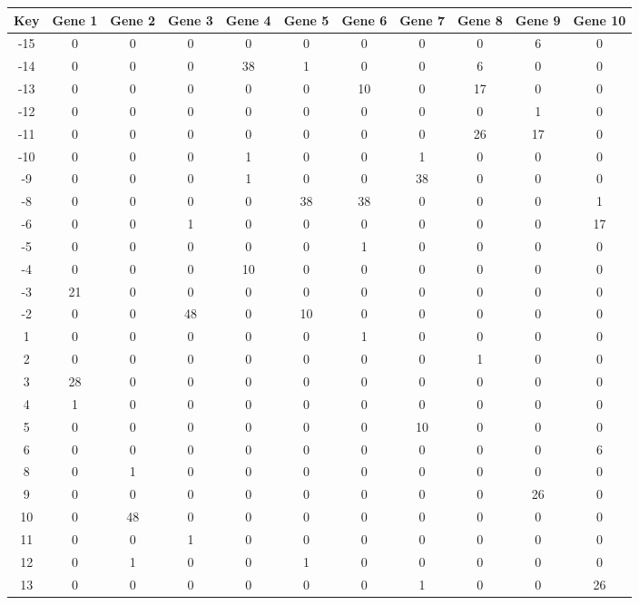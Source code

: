 \begin{tabular}{|c|c|c|c|c|c|c|c|c|c|c|}
\hline
Key & Gene 1 & Gene 2 & Gene 3 & Gene 4 & Gene 5 & Gene 6 & Gene 7 & Gene 8 & Gene 9 & Gene 10 \\
\hline
-15 & 0 & 0 & 0 & 0 & 0 & 0 & 0 & 0 & 6 & 0 \\
-14 & 0 & 0 & 0 & 38 & 1 & 0 & 0 & 6 & 0 & 0 \\
-13 & 0 & 0 & 0 & 0 & 0 & 10 & 0 & 17 & 0 & 0 \\
-12 & 0 & 0 & 0 & 0 & 0 & 0 & 0 & 0 & 1 & 0 \\
-11 & 0 & 0 & 0 & 0 & 0 & 0 & 0 & 26 & 17 & 0 \\
-10 & 0 & 0 & 0 & 1 & 0 & 0 & 1 & 0 & 0 & 0 \\
-9 & 0 & 0 & 0 & 1 & 0 & 0 & 38 & 0 & 0 & 0 \\
-8 & 0 & 0 & 0 & 0 & 38 & 38 & 0 & 0 & 0 & 1 \\
-6 & 0 & 0 & 1 & 0 & 0 & 0 & 0 & 0 & 0 & 17 \\
-5 & 0 & 0 & 0 & 0 & 0 & 1 & 0 & 0 & 0 & 0 \\
-4 & 0 & 0 & 0 & 10 & 0 & 0 & 0 & 0 & 0 & 0 \\
-3 & 21 & 0 & 0 & 0 & 0 & 0 & 0 & 0 & 0 & 0 \\
-2 & 0 & 0 & 48 & 0 & 10 & 0 & 0 & 0 & 0 & 0 \\
1 & 0 & 0 & 0 & 0 & 0 & 1 & 0 & 0 & 0 & 0 \\
2 & 0 & 0 & 0 & 0 & 0 & 0 & 0 & 1 & 0 & 0 \\
3 & 28 & 0 & 0 & 0 & 0 & 0 & 0 & 0 & 0 & 0 \\
4 & 1 & 0 & 0 & 0 & 0 & 0 & 0 & 0 & 0 & 0 \\
5 & 0 & 0 & 0 & 0 & 0 & 0 & 10 & 0 & 0 & 0 \\
6 & 0 & 0 & 0 & 0 & 0 & 0 & 0 & 0 & 0 & 6 \\
8 & 0 & 1 & 0 & 0 & 0 & 0 & 0 & 0 & 0 & 0 \\
9 & 0 & 0 & 0 & 0 & 0 & 0 & 0 & 0 & 26 & 0 \\
10 & 0 & 48 & 0 & 0 & 0 & 0 & 0 & 0 & 0 & 0 \\
11 & 0 & 0 & 1 & 0 & 0 & 0 & 0 & 0 & 0 & 0 \\
12 & 0 & 1 & 0 & 0 & 1 & 0 & 0 & 0 & 0 & 0 \\
13 & 0 & 0 & 0 & 0 & 0 & 0 & 1 & 0 & 0 & 26 \\
\hline
\end{tabular}